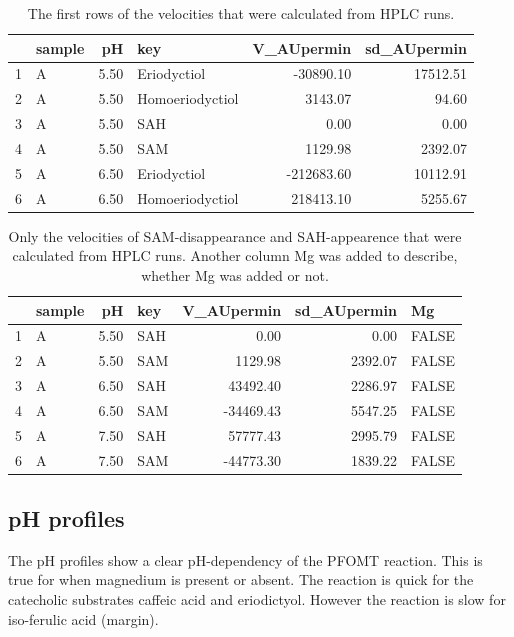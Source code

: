 \documentclass[]{tufte-handout}
\begin{document}
\begin{table}[ht]
\centering
\begin{tabular}{rlrlrr}
  \toprule
 & sample & pH & key & V\_AUpermin & sd\_AUpermin \\ 
  \midrule
1 & A & 5.50 & Eriodyctiol & -30890.10 & 17512.51 \\ 
  2 & A & 5.50 & Homoeriodyctiol & 3143.07 & 94.60 \\ 
  3 & A & 5.50 & SAH & 0.00 & 0.00 \\ 
  4 & A & 5.50 & SAM & 1129.98 & 2392.07 \\ 
  5 & A & 6.50 & Eriodyctiol & -212683.60 & 10112.91 \\ 
  6 & A & 6.50 & Homoeriodyctiol & 218413.10 & 5255.67 \\ 
   \bottomrule
\end{tabular}
\caption{The first rows of the velocities that were calculated from HPLC runs.} 
\end{table}\begin{table}[ht]
\centering
\begin{tabular}{rlrlrrl}
  \toprule
 & sample & pH & key & V\_AUpermin & sd\_AUpermin & Mg \\ 
  \midrule
1 & A & 5.50 & SAH & 0.00 & 0.00 & FALSE \\ 
  2 & A & 5.50 & SAM & 1129.98 & 2392.07 & FALSE \\ 
  3 & A & 6.50 & SAH & 43492.40 & 2286.97 & FALSE \\ 
  4 & A & 6.50 & SAM & -34469.43 & 5547.25 & FALSE \\ 
  5 & A & 7.50 & SAH & 57777.43 & 2995.79 & FALSE \\ 
  6 & A & 7.50 & SAM & -44773.30 & 1839.22 & FALSE \\ 
   \bottomrule
\end{tabular}
\caption{Only the velocities of SAM-disappearance and SAH-appearence that were calculated from HPLC runs. Another column Mg was added to describe, whether Mg was added or not.} 
\end{table}

\subsection{pH profiles}\label{ph-profiles}

The pH profiles show a clear pH-dependency of the PFOMT reaction. This
is true for when magnedium is present or absent. The reaction is quick
for the catecholic substrates caffeic acid and eriodictyol. However the
reaction is slow for iso-ferulic acid (margin).
\end{document}
